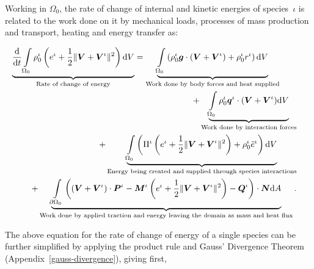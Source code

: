 Working in $\Omega_0$, the rate of change of internal and kinetic
energies of species~$\iota$ is related to the work done on it by
mechanical loads, processes of mass production and transport, heating
and energy transfer as:

\begin{eqnarray}
\underbrace{\frac{\mathrm{d}}{\mathrm{d}t}
  \int\limits_{\Omega_0}\rho_0^\iota \left ( e^\iota + \frac{1}{2}
  \Vert\mbox{\boldmath$ V$}+\mbox{\boldmath$ V$}^\iota\Vert^2 \right ) \mathrm{d}V}_{\text{Rate of
    change of energy}} = \underbrace{\int\limits_{\Omega_0}
  \left(\rho_0^\iota\mbox{\boldmath$ g$} \cdot\left(\mbox{\boldmath$ V$}+\mbox{\boldmath$ V$}^\iota\right) + \rho_0^\iota
  r^\iota \right)\mathrm{d}V}_{\text{Work done by body forces and heat
    supplied}}\qquad& &\nonumber\\ +\underbrace{\int\limits_{\Omega_0}
  \rho_0^\iota\mbox{\boldmath$ q$}^\iota\cdot(\mbox{\boldmath$ V$} + \mbox{\boldmath$ V$}^\iota) \mathrm{d}V}_{\text{Work
    done by interaction forces}}& &\nonumber\\ +
\underbrace{\int\limits_{\Omega_0} \left(\Pi^\iota\left(e^\iota +
  \frac{1}{2}\Vert\mbox{\boldmath$ V$}+\mbox{\boldmath$ V$}^\iota\Vert^2\right) +
  \rho^\iota_0\tilde{e}^\iota\right)\mathrm{d}V}_{\text{Energy being
    created and supplied through species interactions}} & & \nonumber
\\ + \underbrace{\int\limits_{\partial \Omega_0}
  \left(\left(\mbox{\boldmath$ V$}+\mbox{\boldmath$ V$}^\iota\right)\cdot\mbox{\boldmath$ P$}^\iota -
  \mbox{\boldmath$ M$}^\iota\left(e^\iota +\frac{1}{2} \Vert\mbox{\boldmath$ V$}+\mbox{\boldmath$ V$}^\iota\Vert^2\right)
  - \mbox{\boldmath$ Q$}^\iota\right)\cdot\mbox{\boldmath$ N$}\mathrm{d}A}_{\text{Work done by applied
    traction and energy leaving the domain as mass and heat flux}}.
\label{globalbalanceofenergy}
\end{eqnarray}

The above equation for the rate of change of energy of a single
species can be further simplified by applying the product rule and
Gauss' Divergence Theorem (Appendix~\ref{gauss-divergence}), giving
first,

